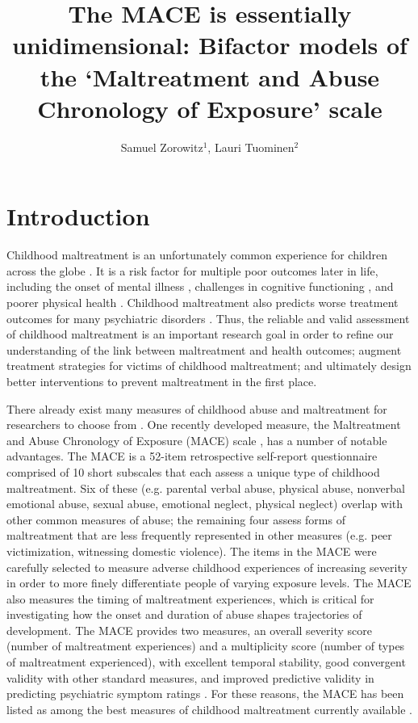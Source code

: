 \documentclass[letterpaper,man,natbib]{apa6}  %
\title{The MACE is essentially unidimensional: Bifactor models of the `Maltreatment and Abuse Chronology of Exposure' scale}
\author{Samuel Zorowitz$^1$, Lauri Tuominen$^{2}$}
\affiliation{$^1$Princeton Neuroscience Institute, Princeton University, USA\\$^2$The Royal’s Institute of Mental Health Research, University of Ottawa, Canada}
\begin{document}
\maketitle

\section{Introduction}

Childhood maltreatment is an unfortunately common experience for children across the globe \citep{stoltenborgh2015prevalence}. It is a risk factor for multiple poor outcomes later in life, including the onset of mental illness \citep{macmillan2001childhood, green2010childhood, kessler2010childhood}, challenges in cognitive functioning \citep{kavanaugh2017neurocognitive, r2018common, su2019does}, and poorer physical health \citep{wegman2009meta, widom2012prospective, goodwin2004association}. Childhood maltreatment also predicts worse treatment outcomes for many psychiatric disorders \citep{nanni2012childhood, thomas2019childhood, schuckher2019history}. Thus, the reliable and valid assessment of childhood maltreatment is an important research goal in order to refine our understanding of the link between maltreatment and health outcomes; augment treatment strategies for victims of childhood maltreatment; and ultimately design better interventions to prevent maltreatment in the first place. 

There already exist many measures of childhood abuse and maltreatment for researchers to choose from \citep{saini2019systematic}. One recently developed measure, the Maltreatment and Abuse Chronology of Exposure (MACE) scale \citep{teicher2015maltreatment}, has a number of notable advantages. The MACE is a 52-item retrospective self-report questionnaire comprised of 10 short subscales that each assess a unique type of childhood maltreatment. Six of these (e.g. parental verbal abuse, physical abuse, nonverbal emotional abuse, sexual abuse, emotional neglect, physical neglect) overlap with other common measures of abuse; the remaining four assess forms of maltreatment that are less frequently represented in other measures (e.g. peer victimization, witnessing domestic violence). The items in the MACE were carefully selected to measure adverse childhood experiences of increasing severity in order to more finely differentiate people of varying exposure levels. The MACE also measures the timing of maltreatment experiences, which is critical for investigating how the onset and duration of abuse shapes trajectories of development. The MACE provides two measures, an overall severity score (number of maltreatment experiences) and a multiplicity score (number of types of maltreatment experienced), with excellent temporal stability, good convergent validity with other standard measures, and improved predictive validity in predicting psychiatric symptom ratings \citep{teicher2015maltreatment}. For these reasons, the MACE has been listed as among the best measures of childhood maltreatment currently available \citep{saini2019systematic, georgieva2022systematic}.
\end{document}
